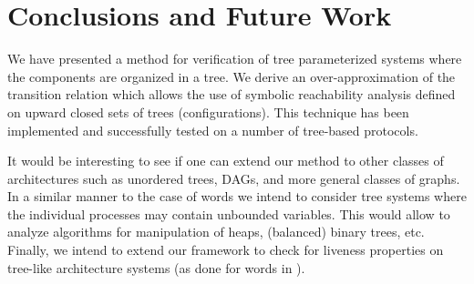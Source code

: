 \section{Conclusions and Future Work}
\label{sec:conc}

We have presented a method for verification of tree parameterized systems
where the components are organized in  a tree.
%
We derive an over-approximation of the transition
relation which allows the use of symbolic reachability
analysis defined on upward closed sets of trees
(configurations).
%
This technique has been implemented and successfully tested on a number of
tree-based protocols.
%


It would be interesting to see if
one can extend our method to other classes of 
architectures such as unordered trees, DAGs, and more general classes of graphs.
%
In a similar manner to the case of words \cite{rmc:wo:transducers:infinite}
we intend  to consider tree systems where
the individual processes may contain unbounded variables.
%
This would allow to analyze algorithms for manipulation of heaps,
(balanced) binary trees, etc.
%
Finally, we intend to extend our framework to check for liveness
properties on tree-like architecture systems (as done for
words in \cite{AJNOS04}).
